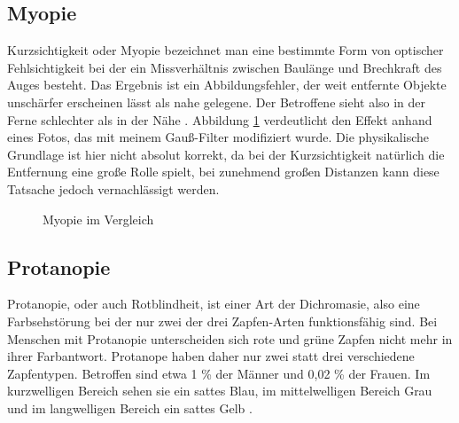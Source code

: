 \documentclass[a4paper]{article}
\begin{document}
\subsection*{Myopie}
Kurzsichtigkeit oder Myopie bezeichnet man eine bestimmte Form von optischer Fehlsichtigkeit bei der ein Missverhältnis zwischen Baulänge und Brechkraft des Auges besteht. Das Ergebnis ist ein Abbildungsfehler, der weit entfernte Objekte unschärfer erscheinen lässt als nahe gelegene. Der Betroffene sieht also in der Ferne schlechter als in der Nähe \cite{WP-KS}. Abbildung \ref{myopia} verdeutlicht den Effekt anhand eines Fotos, das mit meinem Gauß-Filter modifiziert wurde. Die physikalische Grundlage ist hier nicht absolut korrekt, da bei der Kurzsichtigkeit natürlich die Entfernung eine große Rolle spielt, bei zunehmend großen Distanzen kann diese Tatsache jedoch vernachlässigt werden.

\begin{figure}[H]
\centering
{}
\caption{Myopie im Vergleich}
\label{myopia}
\end{figure}

\newpage

\subsection*{Protanopie}
Protanopie, oder auch Rotblindheit, ist einer Art der Dichromasie, also eine Farbsehstörung bei der nur zwei der drei Zapfen-Arten funktionsfähig sind. Bei Menschen mit Protanopie unterscheiden sich rote und grüne Zapfen nicht mehr in ihrer Farbantwort. Protanope haben daher nur zwei statt drei verschiedene Zapfentypen. Betroffen sind etwa 1 \% der Männer und 0,02 \% der Frauen. Im kurzwelligen Bereich sehen sie ein sattes Blau, im mittelwelligen Bereich Grau und im langwelligen Bereich ein sattes Gelb \cite{WP-P}.
\end{document}
